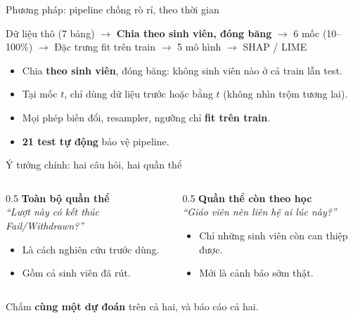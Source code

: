 \documentclass[aspectratio=169,11pt]{beamer}
\begin{document}
\begin{frame}{Phương pháp: pipeline chống rò rỉ, theo thời gian}
\begin{center}\small\color{themecol}
Dữ liệu thô (7 bảng) $\rightarrow$ \textbf{Chia theo sinh viên, đóng băng} $\rightarrow$ 6 mốc (10--100\%)
$\rightarrow$ Đặc trưng fit trên train $\rightarrow$ 5 mô hình $\rightarrow$ SHAP / LIME
\end{center}
\vspace{0.3em}
\begin{itemize}
  \item Chia \textbf{theo sinh viên}, đóng băng: không sinh viên nào ở cả train lẫn test.
  \item Tại mốc $t$, chỉ dùng dữ liệu trước hoặc bằng $t$ (không nhìn trộm tương lai).
  \item Mọi phép biến đổi, resampler, ngưỡng chỉ \textbf{fit trên train}.
  \item \textbf{21 test tự động} bảo vệ pipeline.
\end{itemize}
\end{frame}

\begin{frame}{Ý tưởng chính: hai câu hỏi, hai quần thể}
\begin{columns}
\begin{column}{0.5\textwidth}
\textbf{Toàn bộ quần thể}\\
\footnotesize\emph{``Lượt này có kết thúc Fail/Withdrawn?''}
\begin{itemize}\footnotesize
  \item Là cách nghiên cứu trước dùng.
  \item Gồm cả sinh viên đã rút.
\end{itemize}
\end{column}
\begin{column}{0.5\textwidth}
\textbf{Quần thể còn theo học}\\
\footnotesize\emph{``Giáo viên nên liên hệ ai lúc này?''}
\begin{itemize}\footnotesize
  \item Chỉ những sinh viên còn can thiệp được.
  \item Mới là cảnh báo sớm thật.
\end{itemize}
\end{column}
\end{columns}
\vspace{0.5em}
\begin{block}{}\centering\color{themecol} Chấm \textbf{cùng một dự đoán} trên cả hai, và báo cáo cả hai.\end{block}
\end{frame}
\end{document}
